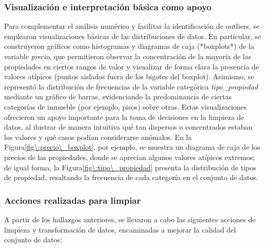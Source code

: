 \subsubsection{Visualización e interpretación básica como apoyo}
Para complementar el análisis numérico y facilitar la identificación de outliers, se emplearon visualizaciones básicas de las distribuciones de datos. En particular, se construyeron gráficos como histogramas y diagramas de caja (*boxplots*) de la variable \emph{precio}, que permitieron observar la concentración de la mayoría de las propiedades en ciertos rangos de valor y visualizar de forma clara la presencia de valores atípicos (puntos aislados fuera de los bigotes del boxplot). Asimismo, se representó la distribución de frecuencias de la variable categórica \emph{tipo\_propiedad} mediante un gráfico de barras, evidenciando la predominancia de ciertas categorías de inmueble (por ejemplo, pisos) sobre otras. Estas visualizaciones ofrecieron un apoyo importante para la toma de decisiones en la limpieza de datos, al ilustrar de manera intuitiva qué tan dispersos o concentrados estaban los valores y qué casos podían considerarse anómalos. En la Figura\~\ref{fig\:precio\_boxplot}, por ejemplo, se muestra un diagrama de caja de los precios de las propiedades, donde se aprecian algunos valores atípicos extremos; de igual forma, la Figura\~\ref{fig\:tipo\_propiedad} presenta la distribución de tipos de propiedad, resaltando la frecuencia de cada categoría en el conjunto de datos.



\subsubsection{Acciones realizadas para limpiar}
A partir de los hallazgos anteriores, se llevaron a cabo las siguientes acciones de limpieza y transformación de datos, encaminadas a mejorar la calidad del conjunto de datos:

